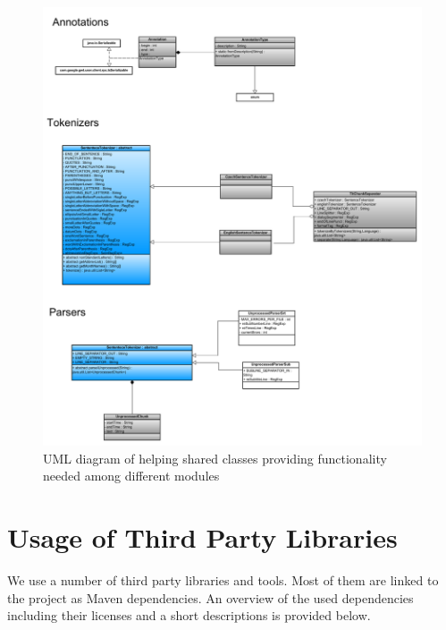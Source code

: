 \begin{figure}
\begin{center}
\includegraphics[scale=0.38]{figures/shared2.pdf}
\end{center}
\caption{UML diagram of helping shared classes providing functionality needed among different modules}
\label{fig:shared_uml_helping}
\end{figure}

\section{Usage of Third Party Libraries}

We use a number of third party libraries and tools. Most of them are linked to the project as Maven dependencies. An overview of the used dependencies including their licenses and a short descriptions is provided below.

